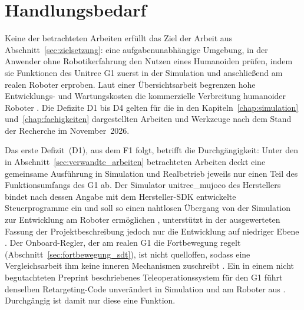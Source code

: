 \section{Handlungsbedarf}
\label{sec:handlungsbedarf}
Keine der betrachteten Arbeiten erfüllt das Ziel der Arbeit aus Abschnitt~\ref{sec:zielsetzung}: eine aufgabenunabhängige Umgebung, in der Anwender ohne Robotikerfahrung den Nutzen eines Humanoiden prüfen, indem sie Funktionen des Unitree G1 zuerst in der Simulation und anschließend am realen Roboter erproben.
Laut einer Übersichtsarbeit begrenzen hohe Entwicklungs- und Wartungskosten die kommerzielle Verbreitung humanoider Roboter \cite{Tong2024}.
Die Defizite D1 bis D4 gelten für die in den Kapiteln~\ref{chap:simulation} und~\ref{chap:faehigkeiten} dargestellten Arbeiten und Werkzeuge nach dem Stand der Recherche im November~2026.

Das erste Defizit~(D1), aus dem F1 folgt, betrifft die Durchgängigkeit: Unter den in Abschnitt~\ref{sec:verwandte_arbeiten} betrachteten Arbeiten deckt eine gemeinsame Ausführung in Simulation und Realbetrieb jeweils nur einen Teil des Funktionsumfangs des G1 ab.
Der Simulator unitree\_mujoco des Herstellers bindet nach dessen Angabe mit dem Hersteller-SDK entwickelte Steuerprogramme ein und soll so einen nahtlosen Übergang von der Simulation zur Entwicklung am Roboter ermöglichen \cite{UnitreeMujoco}, unterstützt in der ausgewerteten Fassung der Projektbeschreibung jedoch nur die Entwicklung auf niedriger Ebene \cite{UnitreeMujoco}.
Der Onboard-Regler, der am realen G1 die Fortbewegung regelt (Abschnitt~\ref{sec:fortbewegung_sdt}), ist nicht quelloffen, sodass eine Vergleichsarbeit ihm keine inneren Mechanismen zuschreibt \cite{Hu2026}.
Ein in einem nicht begutachteten Preprint beschriebenes Teleoperationssystem für den G1 führt denselben Retargeting-Code unverändert in Simulation und am Roboter aus \cite{Durrani2026}. Durchgängig ist damit nur diese eine Funktion.

